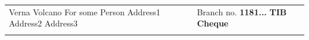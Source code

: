 \documentclass{article}%
\begin{document}
%
\normalsize%
\begin{tabu}{X[l] X[r]}%
\begin{minipage}[h]{0.49\textwidth}%
Verna Volcano%
\newline%
%
For some Person%
\newline%
%
Address1%
\newline%
%
Address2%
\newline%
%
Address3%
\end{minipage}&\begin{minipage}[t!]{0.49\textwidth}%
\flushright%
Branch no.%
\linebreak%
\textbf{1181...}%
\linebreak%
\textbf{TIB Cheque}%
\end{minipage}\\%
&\\%
\end{tabu}%
\pagestyle{firstpage}%
\renewcommand{\arraystretch}{1.5}%
\end{document}

